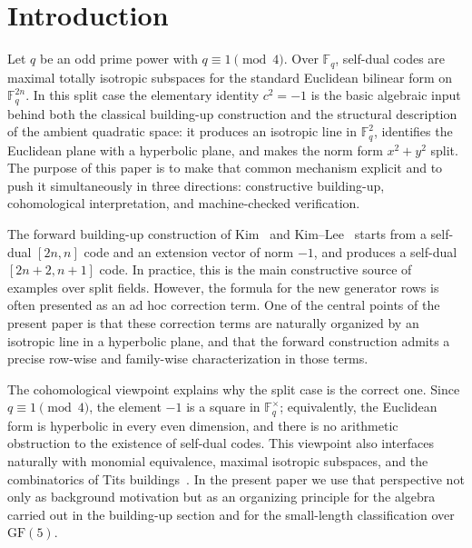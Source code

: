 \documentclass[12pt]{article}
\newcommand{\F}{\mathbb{F}}
\newcommand{\GF}[1]{\ensuremath{\mathrm{GF}(#1)}}
\begin{document}



\section{Introduction}
\label{sec:intro}

Let $q$ be an odd prime power with $q \equiv 1 \pmod 4$. Over $\F_q$, self-dual codes are maximal totally isotropic subspaces for the standard Euclidean bilinear form on $\F_q^{2n}$. In this split case the elementary identity $c^2=-1$ is the basic algebraic input behind both the classical building-up construction and the structural description of the ambient quadratic space: it produces an isotropic line in $\F_q^2$, identifies the Euclidean plane with a hyperbolic plane, and makes the norm form $x^2+y^2$ split. The purpose of this paper is to make that common mechanism explicit and to push it simultaneously in three directions: constructive building-up, cohomological interpretation, and machine-checked verification.

The forward building-up construction of Kim~\cite{Kim2001} and Kim--Lee~\cite{KimLee2009,LeeKim} starts from a self-dual $[2n,n]$ code and an extension vector of norm $-1$, and produces a self-dual $[2n+2,n+1]$ code. In practice, this is the main constructive source of examples over split fields. However, the formula for the new generator rows is often presented as an ad hoc correction term. One of the central points of the present paper is that these correction terms are naturally organized by an isotropic line in a hyperbolic plane, and that the forward construction admits a precise row-wise and family-wise characterization in those terms.

The cohomological viewpoint explains why the split case is the correct one. Since $q \equiv 1 \pmod 4$, the element $-1$ is a square in $\F_q^\times$; equivalently, the Euclidean form is hyperbolic in every even dimension, and there is no arithmetic obstruction to the existence of self-dual codes. This viewpoint also interfaces naturally with monomial equivalence, maximal isotropic subspaces, and the combinatorics of Tits buildings~\cite{Abramenko,Solomon}. In the present paper we use that perspective not only as background motivation but as an organizing principle for the algebra carried out in the building-up section and for the small-length classification over $\GF{5}$.
\end{document}
